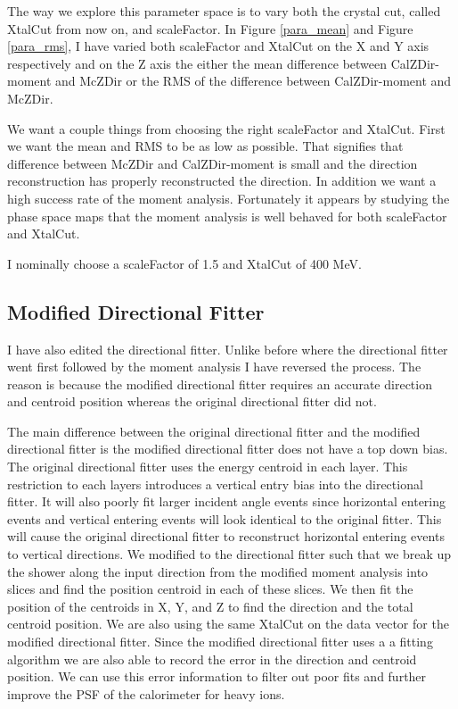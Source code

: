 \documentclass[11pt]{article}
\begin{document}
The way we explore this parameter space is to vary both the crystal cut, called XtalCut from now on, and scaleFactor.  In Figure \ref{para_mean} and Figure \ref{para_rms}, I have varied both scaleFactor and XtalCut on the X and Y axis respectively and on the Z axis the either the mean difference between CalZDir-moment and McZDir or the RMS of the difference between CalZDir-moment and McZDir.  

We want a couple things from choosing the right scaleFactor and XtalCut. First we want the mean and RMS to be as low as possible.  That signifies that difference between McZDir and CalZDir-moment is small and the direction reconstruction has properly reconstructed the direction.  In addition we want a high success rate of the moment analysis.  Fortunately it appears by studying the phase space maps that the moment analysis is well behaved for both scaleFactor and XtalCut.

I nominally choose a scaleFactor of 1.5 and XtalCut of 400 MeV.

\subsection{Modified Directional Fitter}

I have also edited the directional fitter.  Unlike before where the directional fitter went first followed by the moment analysis I have reversed the process.  The reason is because the modified directional fitter requires an accurate direction and centroid position whereas the original directional fitter did not.  

The main difference between the original directional fitter and the modified directional fitter is the modified directional fitter does not have a top down bias.  The original directional fitter uses the energy centroid in each layer.  This restriction to each layers introduces a vertical entry bias into the directional fitter.  It will also poorly fit larger incident angle events since horizontal entering events and vertical entering events will look identical to the original fitter.  This will cause the original directional fitter to reconstruct horizontal entering events to vertical directions.  We modified to the directional fitter such that we break up the shower along the input direction from the modified moment analysis  into slices and find the position centroid in each of these slices.  We then fit the position of the centroids in X, Y, and Z to find the direction and the total centroid position.  We are also using the same XtalCut on the data vector for the modified directional fitter.  Since the modified directional fitter uses a a fitting algorithm we are also able to record the error in the direction and centroid position.  We can use this error information to filter out poor fits and further improve the PSF of the calorimeter for heavy ions.
\end{document}

